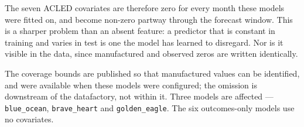 \noindent The seven ACLED covariates are therefore zero for every month these models were fitted
on, and become non-zero partway through the forecast window. This is a sharper problem than an
absent feature: a predictor that is constant in training and varies in test is one the model has
learned to disregard. Nor is it visible in the data, since manufactured and observed zeros are
written identically.

The coverage bounds are published so that manufactured values can be identified, and were available
when these models were configured; the omission is downstream of the datafactory, not within it.
Three models are affected --- \texttt{blue\_ocean}, \texttt{brave\_heart} and
\texttt{golden\_eagle}. The six outcomes-only models use no covariates.
